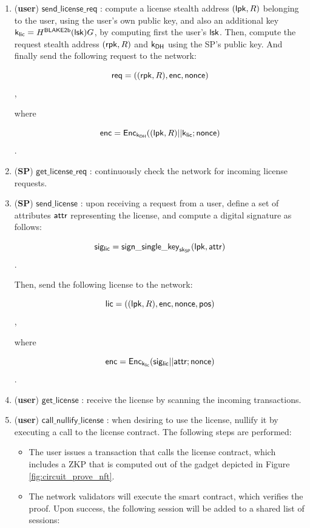 \begin{enumerate}
	\item (\textbf{user}) $\mathsf{send\_license\_req}$ : compute a license stealth address $(\mathsf{lpk}, R)$ belonging to the user, using the user's own public key, and also an additional key $\mathsf{k}_{\mathsf{lic}} = H^\mathsf{BLAKE2b}(\mathsf{lsk})G$, by computing first the user's $\mathsf{lsk}$. Then, compute the request stealth address $(\mathsf{rpk}, R)$ and $\mathsf{k_{DH}}$ using the SP's public key. And finally send the following request to the network:


		$$\mathsf{req} = ((\mathsf{rpk}, R), \mathsf{enc}, \mathsf{nonce})$$,

	where 

		$$\mathsf{enc} = \mathsf{Enc}_{\mathsf{k_{DH}}} ((\mathsf{lpk}, R)||\mathsf{k}_{\mathsf{lic}}; \mathsf{nonce})$$.


	\item (\textbf{SP}) $\mathsf{get\_license\_req}$ : continuously check the network for incoming license requests.

	\item (\textbf{SP}) $\mathsf{send\_license}$ : upon receiving a request from a user, define a set of attributes $\mathsf{attr}$ representing the license, and compute a digital signature as follows:

		$$\mathsf{sig_{lic}} = \mathsf{sign\_single\_key}_{\mathsf{sk}_{\mathsf{SP}}}(\mathsf{lpk}, \mathsf{attr})$$.

	Then, send the following license to the network:

		$$\mathsf{lic} = ((\mathsf{lpk}, R), \mathsf{enc}, \mathsf{nonce}, \mathsf{pos})$$,

	where 

		$$\mathsf{enc} = \mathsf{Enc}_{\mathsf{k}_{\mathsf{lic}}} (\mathsf{sig_{lic}} || \mathsf{attr}; \mathsf{nonce})$$.

	\item (\textbf{user}) $\mathsf{get\_license}$ : receive the license by scanning the incoming transactions.

	\item (\textbf{user}) $\mathsf{call\_nullify\_license}$ : when desiring to use the license, nullify it by executing a call to the license contract. The following steps are performed:

	\begin{itemize}
		\item The user issues a transaction that calls the license contract, which includes a ZKP that is computed out of the gadget depicted in Figure \ref{fig:circuit_prove_nft}.
		\item The network validators will execute the smart contract, which verifies the proof. Upon success, the following session will be added to a shared list of sessions:


\end{itemize}
\end{enumerate}
